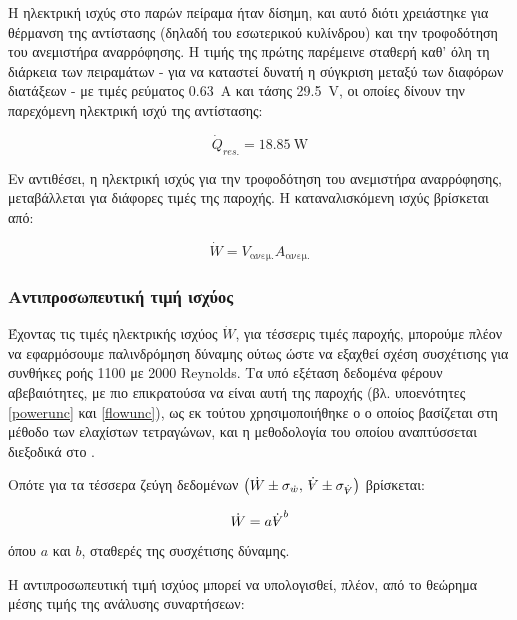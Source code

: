 \noindent Η ηλεκτρική ισχύς στο παρών πείραμα ήταν δίσημη, και αυτό διότι χρειάστηκε για θέρμανση της αντίστασης (δηλαδή του εσωτερικού κυλίνδρου) και την τροφοδότηση του ανεμιστήρα αναρρόφησης. Η τιμής της πρώτης παρέμεινε σταθερή καθ' όλη τη διάρκεια των πειραμάτων - για να καταστεί δυνατή η σύγκριση μεταξύ των διαφόρων διατάξεων - με τιμές ρεύματος \qty{0,63}{\ampere} και τάσης \qty{29.5}{\volt}, οι οποίες δίνουν την παρεχόμενη ηλεκτρική ισχύ της αντίστασης:

\begin{equation*}
\dot{Q}_{res.} = \qty{18.85}{\watt}
\end{equation*}

\noindent Εν αντιθέσει, η ηλεκτρική ισχύς για την τροφοδότηση του ανεμιστήρα αναρρόφησης, μεταβάλλεται για διάφορες τιμές της παροχής. Η καταναλισκόμενη ισχύς βρίσκεται από:

\begin{equation}\label{eq:fanpower}
\dot{W} = V_{\text{ανεμ.}} A_{\text{ανεμ.}}
\end{equation}

\subsubsection{Αντιπροσωπευτική τιμή ισχύος}\label{reppower}

\noindent Έχοντας τις τιμές ηλεκτρικής ισχύος $\dot{W}$, για τέσσερις τιμές παροχής, μπορούμε πλέον να εφαρμόσουμε παλινδρόμηση δύναμης ούτως ώστε να εξαχθεί σχέση συσχέτισης για συνθήκες ροής 1100 με 2000 Reynolds. Τα υπό εξέταση δεδομένα φέρουν αβεβαιότητες, με πιο επικρατούσα να είναι αυτή της παροχής (βλ. υποενότητες \ref{powerunc} και \ref{flowunc}), ως εκ τούτου χρησιμοποιήθηκε ο  ο οποίος βασίζεται στη μέθοδο των ελαχίστων τετραγώνων, και η μεθοδολογία του οποίου αναπτύσσεται διεξοδικά στο .

Οπότε για τα τέσσερα ζεύγη δεδομένων $\left(\dot{W} \pm \sigma_{\scriptsize{\dot{w}}}, \, \dot{\volume} \pm \sigma_{\scriptsize{\dot{\volume}}}\right)$ βρίσκεται:

\begin{equation}\label{functionwq}
\dot{W} = a\dot{\volume}^b
\end{equation}

\noindent όπου $a$ και $b$, σταθερές της συσχέτισης δύναμης.

Η αντιπροσωπευτική τιμή ισχύος μπορεί να υπολογισθεί, πλέον, από το θεώρημα μέσης τιμής της ανάλυσης συναρτήσεων:

